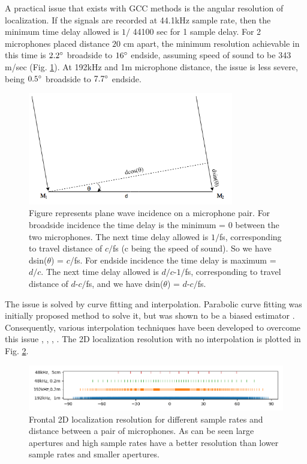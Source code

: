 A practical issue that exists with GCC methods is the angular resolution of localization. If the signals are recorded at 44.1kHz sample rate, then the minimum time delay allowed is $1/$ 44100 sec for 1 sample delay. For 2 microphones placed distance $20$ cm apart, the minimum resolution achievable in this time is $2.2\degree$ broadside to $16\degree$ endside, assuming speed of sound to be 343 m/sec (Fig. \ref{fig:ang_res}). At 192kHz and 1m microphone distance, the issue is less severe, being $0.5\degree$ broadside to $7.7\degree$ endside.
\begin{figure}[H]
     \centering
     \includegraphics[width=0.8\textwidth]{Figures/AngularRes.png}
     \caption{Figure represents plane wave incidence on a microphone pair. For broadside incidence the time delay is the minimum = 0 between the two microphones. The next time delay allowed is $1/$fs, corresponding to travel distance of $c/$fs (c being the speed of sound). So we have  dsin($\theta$) = $c$/fs. For endside incidence the time delay is maximum = $d/c$. The next time delay allowed is $d/c$-$1/$fs, corresponding to travel distance of $d$-$c/$fs, and we have dsin($\theta$) =  $d$-$c/$fs.}
     \label{fig:ang_res}
\end{figure}

The issue is solved by curve fitting and interpolation. Parabolic curve fitting was initially proposed method to solve it, but was shown to be a biased estimator \cite{boucher1981analysis}. Consequently, various interpolation techniques have been developed to overcome this issue \cite{jacovitti1993discrete}, \cite{brandstein1997practical}, \cite{zhang2005cross}, \cite{tervo2008interpolation}. The 2D localization resolution with no interpolation is plotted in Fig. \ref{fig:res_diff}.

\begin{figure}[H]
    \centering
    \includegraphics[width=\textwidth]{Figures/res_diff.png}
    \caption{Frontal 2D localization resolution for different sample rates and distance between a pair of microphones. As can be seen large apertures and high sample rates have a better resolution than lower sample rates and smaller apertures.}
    \label{fig:res_diff}
\end{figure}

